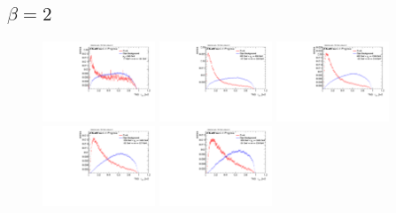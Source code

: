 \subsection*{$\beta=2$}
\begin{figure}
\includegraphics[width=0.3\textwidth]{sascha_input/Appendix/Distributions/top/distributions/beta2/h_assisted_tj_nSub32_2_bin1.pdf} \hspace{1mm}
\includegraphics[width=0.3\textwidth]{sascha_input/Appendix/Distributions/top/distributions/beta2/h_assisted_tj_nSub32_2_bin2.pdf} \hspace{1mm}
\includegraphics[width=0.3\textwidth]{sascha_input/Appendix/Distributions/top/distributions/beta2/h_assisted_tj_nSub32_2_bin3.pdf} 
\bigskip
\includegraphics[width=0.3\textwidth]{sascha_input/Appendix/Distributions/top/distributions/beta2/h_assisted_tj_nSub32_2_bin4.pdf} \hspace{1mm}
\includegraphics[width=0.3\textwidth]{sascha_input/Appendix/Distributions/top/distributions/beta2/h_assisted_tj_nSub32_2_bin5.pdf} \hspace{1mm}

\end{figure}
